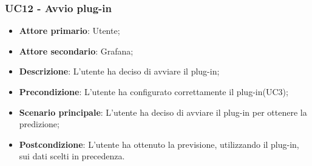\subsubsection{UC12 - Avvio plug-in}
\label{sssec:uc12}
\begin{itemize}
  \item \textbf{Attore primario}: Utente;
  \item \textbf{Attore secondario}: Grafana;
  \item \textbf{Descrizione}: L'utente ha deciso di avviare il plug-in;
  \item \textbf{Precondizione}: L'utente ha configurato correttamente il plug-in(UC3);
  \item \textbf{Scenario principale}: L'utente ha deciso di avviare il plug-in per ottenere la predizione;
  \item \textbf{Postcondizione}: L'utente ha ottenuto la previsione, utilizzando il plug-in, sui dati scelti in precedenza.
\end{itemize}
